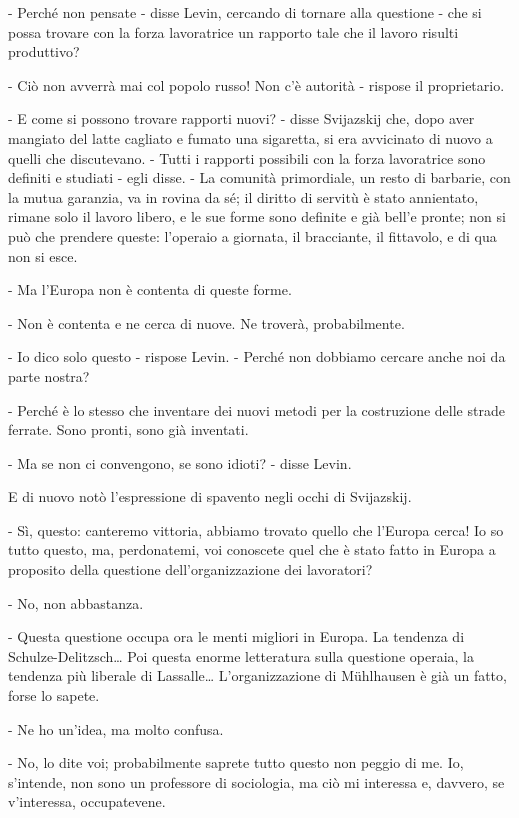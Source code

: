 - Perché non pensate - disse Levin, cercando di tornare alla questione - che si possa trovare con la forza lavoratrice un rapporto tale che il lavoro risulti produttivo? 

- Ciò non avverrà mai col popolo russo! Non c'è autorità - rispose il proprietario. 

- E come si possono trovare rapporti nuovi? - disse Svijazskij che, dopo aver mangiato del latte cagliato e fumato una sigaretta, si era avvicinato di nuovo a quelli che discutevano. - Tutti i rapporti possibili con la forza lavoratrice sono definiti e studiati - egli disse. - La comunità primordiale, un resto di barbarie, con la mutua garanzia, va in rovina da sé; il diritto di servitù è stato annientato, rimane solo il lavoro libero, e le sue forme sono definite e già bell'e pronte; non si può che prendere queste: l'operaio a giornata, il bracciante, il fittavolo, e di qua non si esce. 

- Ma l'Europa non è contenta di queste forme. 

- Non è contenta e ne cerca di nuove. Ne troverà, probabilmente. 

- Io dico solo questo - rispose Levin. - Perché non dobbiamo cercare anche noi da parte nostra? 

- Perché è lo stesso che inventare dei nuovi metodi per la costruzione delle strade ferrate. Sono pronti, sono già inventati. 

- Ma se non ci convengono, se sono idioti? - disse Levin. 

E di nuovo notò l'espressione di spavento negli occhi di Svijazskij. 

- Sì, questo: canteremo vittoria, abbiamo trovato quello che l'Europa cerca! Io so tutto questo, ma, perdonatemi, voi conoscete quel che è stato fatto in Europa a proposito della questione dell'organizzazione dei lavoratori? 

- No, non abbastanza. 

- Questa questione occupa ora le menti migliori in Europa. La tendenza di Schulze-Delitzsch\ldots{} Poi questa enorme letteratura sulla questione operaia, la tendenza più liberale di Lassalle\ldots{} L'organizzazione di Mühlhausen è già un fatto, forse lo sapete. 

- Ne ho un'idea, ma molto confusa. 

- No, lo dite voi; probabilmente saprete tutto questo non peggio di me. Io, s'intende, non sono un professore di sociologia, ma ciò mi interessa e, davvero, se v'interessa, occupatevene. 

